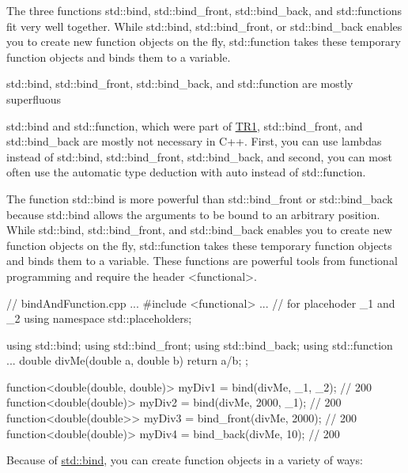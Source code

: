 
The three functions std::bind, std::bind\_front, std::bind\_back, and std::functions fit very well together. While std::bind, std::bind\_front, or std::bind\_back enables you to create new function objects on the fly, std::function takes these temporary function objects and binds them to a variable.

\begin{myTip}{std::bind, std::bind\_front, std::bind\_back, and std::function are mostly superfluous}
	
std::bind and std::function, which were part of \href{https://en.wikipedia.org/wiki/C%2B%2B_Technical_Report_1}{TR1}, std::bind\_front, and std::bind\_back are mostly not necessary in C++. First, you can use lambdas instead of std::bind, std::bind\_front, std::bind\_back, and second, you can most often use the automatic type deduction with auto instead of std::function.
	
\end{myTip}


The function std::bind is more powerful than std::bind\_front or std::bind\_back because std::bind allows the arguments to be bound to an arbitrary position. While std::bind, std::bind\_front, and std::bind\_back enables you to create new function objects on the fly, std::function takes these temporary function objects and binds them to a variable. These functions are powerful tools from functional programming and require the header <functional>.


\begin{cpp}
// bindAndFunction.cpp
...
#include <functional>
...
// for placehoder _1 and _2
using namespace std::placeholders;

using std::bind;
using std::bind_front;
using std::bind_back;
using std::function
...
double divMe(double a, double b){ return a/b; };

function<double(double, double)> myDiv1 = bind(divMe, _1, _2); // 200
function<double(double)> myDiv2 = bind(divMe, 2000, _1); // 200
function<double(double>> myDiv3 = bind_front(divMe, 2000); // 200
function<double(double)> myDiv4 = bind_back(divMe, 10); // 200
\end{cpp}

Because of \href{http://en.cppreference.com/w/cpp/utility/functional/bind}{std::bind}, you can create function objects in a variety of ways:

